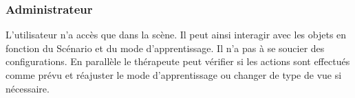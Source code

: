 \subsubsection{Administrateur}
L'utilisateur n'a accès que dans la scène. Il peut ainsi interagir avec les objets en fonction du Scénario et du mode d'apprentissage. Il n'a pas à se soucier des configurations. En parallèle le thérapeute peut vérifier si les actions sont effectués comme prévu et réajuster le mode d'apprentissage ou changer de type de vue si nécessaire.
